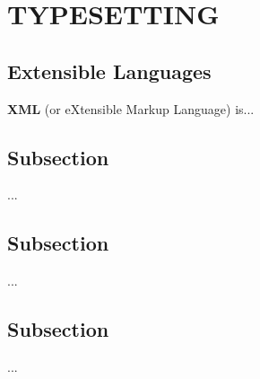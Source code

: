 \documentclass[../report.tex]{subfiles}
\begin{document}
\section{TYPESETTING} %

\subsection{Extensible Languages}

\textbf{XML} (or eXtensible Markup Language) is...

\subsection{Subsection}

...

\subsection{Subsection}

...

\subsection{Subsection}

...
\end{document}

